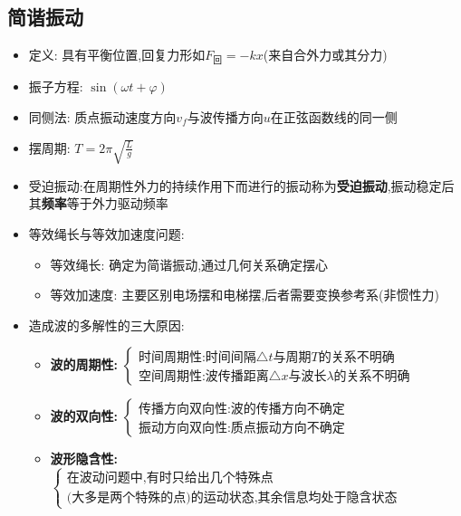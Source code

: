\documentclass{article}
\begin{document}
\subsection{简谐振动}
\begin{itemize}
    \item 定义: 具有平衡位置,回复力形如$F_{\text{回}} = -kx$(来自合外力或其分力)
    \item 振子方程: $\sin{(\omega t + \varphi)}$
    \item 同侧法: 质点振动速度方向$v_{f}$与波传播方向$u$在正弦函数线的同一侧
    \item 摆周期: $T = 2\pi \sqrt{\frac{L}{g}}$
    \item 受迫振动:在周期性外力的持续作用下而进行的振动称为\textbf{受迫振动},振动稳定后其\textbf{频率}等于外力驱动频率
    \item 等效绳长与等效加速度问题:
          \begin{itemize}
              \item 等效绳长: 确定为简谐振动,通过几何关系确定摆心
              \item 等效加速度: 主要区别电场摆和电梯摆,后者需要变换参考系(非惯性力)
          \end{itemize}
    \item  造成波的多解性的三大原因:
          \begin{itemize}
              \item \textbf{波的周期性:}\hspace{1em}
                    $\begin{cases}
                            \text{时间周期性:时间间隔}\triangle t \text{与周期} T \text{的关系不明确} \\
                            \text{空间周期性:波传播距离}\triangle x \text{与波长} \lambda \text{的关系不明确}
                        \end{cases}$

              \item \textbf{波的双向性:}\hspace{1em}
                    $\begin{cases}
                            \text{传播方向双向性:波的传播方向不确定} \\
                            \text{振动方向双向性:质点振动方向不确定}
                        \end{cases}$

              \item \textbf{波形隐含性:}\hspace{1em}
                    $\begin{cases}
                            \text{在波动问题中,有时只给出几个特殊点} \\
                            \text{(大多是两个特殊的点)的运动状态,其余信息均处于隐含状态}
                        \end{cases}$
          \end{itemize}
\end{itemize}
\end{document}
